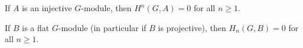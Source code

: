 If $A$ is an injective $G$-module, then $H^n(G, A) = 0$ for all $n \geq 1$.

If $B$ is a flat $G$-module (in particular if $B$ is projective), then $H_n(G, B) = 0$ for all $n \geq 1$.
